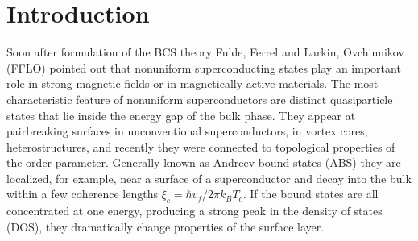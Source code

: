 \documentclass[prb,aps,showpacs,amsmath,twocolumn,10pt]{revtex4-1}
\begin{document}
\section{Introduction}
\label{sec:intro}
%

Soon after formulation of the BCS theory\cite{BCS}
Fulde, Ferrel\cite{PhysRev.135.A550} and Larkin, Ovchinnikov\cite{larkin1965inhomogeneous} (FFLO)
pointed out that nonuniform superconducting states play an important role 
in strong magnetic fields or in magnetically-active materials. 
The most characteristic feature of nonuniform superconductors are distinct quasiparticle states 
that lie inside the energy gap of the bulk phase. 
They appear at pairbreaking surfaces in unconventional superconductors,\cite{CHu1994} 
in vortex cores,\cite{CAROLI1964307} 
heterostructures,\cite{MEschrig2015}
and recently they were connected to topological properties of the order parameter.\cite{Tanaka2012,Mizushima2016}
Generally known as Andreev bound states (ABS) they are localized, for example, near 
a surface of a superconductor and decay into the bulk 
within a few coherence lengths $\xi_{c} = \hbar v_f/2\pi k_B T_c$.
If the bound states are all concentrated at one energy, producing a strong peak in the density of states (DOS), they dramatically change properties 
of the surface layer. 

\end{document}
